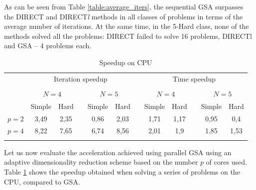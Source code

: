 \documentclass{svproc}
\begin{document}
  As can be seen from Table \ref{table:average_iters}, the sequential GSA surpasses the DIRECT and DIRECT\textit{l} methods in all classes of problems in terms of the average number of iterations. At the same time, in the 5-Hard class, none of the methods solved all the problems: DIRECT failed to solve 16 problems, DIRECTl and GSA -- 4 problems each.


\begin{table}
                \caption{Speedup on CPU}
                \label{table:average_AS_CPU}
                \center
                \begin{tabular}{cccccccccccc}
																	 & \multicolumn{5}{c}{ Iteration speedup} & & \multicolumn{5}{c}{ Time speedup}\\
                               \noalign{\smallskip} \cline{2-6} \cline{8-12}  \\
                                   & \multicolumn{2}{c}{ $N=4$ } & & \multicolumn{2}{c}{$N=5$} &  & \multicolumn{2}{c}{ $N=4$ } & & \multicolumn{2}{c}{$N=5$} \\
                               \noalign{\smallskip} \cline{2-3} \cline{5-6}  \cline{8-9} \cline{11-12} \noalign{\smallskip}
                               & Simple & Hard & & Simple & Hard &  & Simple & Hard & & Simple & Hard  \\
                               \noalign{\smallskip} \hline \noalign{\smallskip}                               
                               $p=2$&   3,49 & 2,35 &   & 0,86 & 2,03 &   & 1,71 & 1,17 &   & 0,95 & 0,4 \\
                               $p=4$&   8,22 & 7,65 &   & 6,74 & 8,56 &   & 2,01 & 1,9  &   & 1,85 & 1,53 \\
                               \noalign{\smallskip}\hline
                \end{tabular}
\end{table}


   Let us now evaluate the acceleration achieved using parallel GSA using an adaptive dimensionality reduction scheme based on the number $p$ of cores used. Table \ref{table:average_AS_CPU} shows the speedup obtained when solving a series of problems on the CPU, compared to GSA.
   
\end{document}
